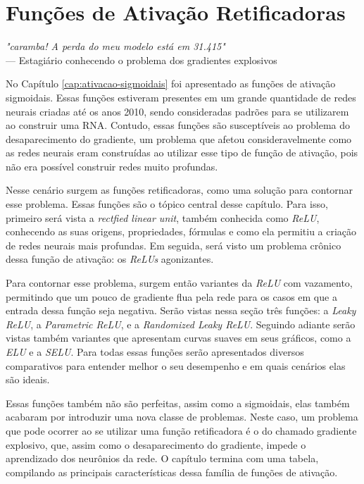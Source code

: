
\chapter{Funções de Ativação Retificadoras}
\label{cap:ativacao-retificadoras}

\begin{flushright}
\textit{"caramba! A perda do meu modelo está em 31.415"} \\
--- Estagiário conhecendo o problema dos gradientes explosivos
\end{flushright}

No Capítulo \ref{cap:ativacao-sigmoidais} foi apresentado as funções de ativação sigmoidais. Essas funções estiveram presentes em um grande quantidade de redes neurais criadas até os anos 2010, sendo consideradas padrões para se utilizarem ao construir uma RNA. Contudo, essas funções são susceptíveis ao problema do desaparecimento do gradiente, um problema que afetou consideravelmente como as redes neurais eram construídas ao utilizar esse tipo de função de ativação, pois não era possível construir redes muito profundas.

Nesse cenário surgem as funções retificadoras, como uma solução para contornar esse problema. Essas funções são o tópico central desse capítulo. Para isso, primeiro será vista a \textit{rectfied linear unit}, também conhecida como \textit{ReLU}, conhecendo as suas origens, propriedades, fórmulas e como ela permitiu a criação de redes neurais mais profundas. Em seguida, será visto um problema crônico dessa função de ativação: os \textit{ReLUs} agonizantes.

Para contornar esse problema, surgem então variantes da \textit{ReLU} com vazamento, permitindo que um pouco de gradiente flua pela rede para os casos em que a entrada dessa função seja negativa. Serão vistas nessa seção três funções: a \textit{Leaky ReLU}, a \textit{Parametric ReLU}, e a \textit{Randomized Leaky ReLU}. Seguindo adiante serão vistas também variantes que apresentam curvas suaves em seus gráficos, como a \textit{ELU} e a \textit{SELU}. Para todas essas funções serão apresentados diversos comparativos para entender melhor o seu desempenho e em quais cenários elas são ideais.

Essas funções também não são perfeitas, assim como a sigmoidais, elas também acabaram por introduzir uma nova classe de problemas. Neste caso, um problema que pode ocorrer ao se utilizar uma função retificadora é o do chamado gradiente explosivo, que, assim como o desaparecimento do gradiente, impede o aprendizado dos neurônios da rede. O capítulo termina com uma tabela, compilando as principais características dessa família de funções de ativação.

